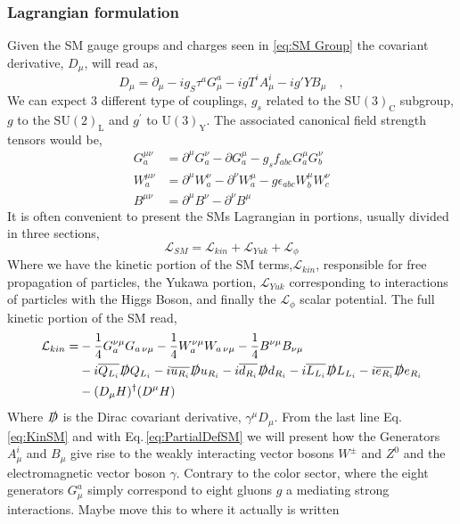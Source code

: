 \subsubsection{Lagrangian formulation }
Given the SM gauge groups and charges seen in \ref{eq:SM Group} the covariant derivative, $D_\mu$, will read as, 
%
\begin{equation}
\label{eq:PartialDefSM}
D_\mu = \partial_\mu - i g_S \tau^a G^a_\mu - i g T^i A^i_\mu - i g' Y B_\mu \quad ,  
\end{equation}  
%
We can expect 3 different type of couplings, $g_s$ related to the $\mathrm{SU(3)_C}$ subgroup, $g$ to the $\mathrm{SU(2)_L}$ and $g^\prime$ to $\mathrm{U(3)_Y}$. The associated canonical field strength tensors would be,
\begin{align}
G_a^{\mu \nu} & = \partial^\mu G^\nu_a - \partial G^\mu_a - g_s f_{abc} G_a^\mu G_b^\nu  \\ 
W_a^{\mu \nu} & = \partial^\mu W^\nu_a - \partial^\nu W^\mu_a  - g \epsilon_{abc} W^\mu_b W^\nu_c \\
B^{\mu \nu}   & = \partial^\mu B^\nu - \partial^\nu B^\mu 
\end{align}
It is often convenient to present the SMs Lagrangian in portions, usually divided in three sections,
\begin{equation}
\mathcal{L}_{SM} = \mathcal{L}_{kin}  +  \mathcal{L}_{Yuk} +  \mathcal{L}_{\phi} 	
\end{equation}
Where we have the kinetic portion of the SM terms,$\mathcal{L}_{kin}$, responsible for  free propagation of particles, the Yukawa portion, $\mathcal{L}_{Yuk}$  corresponding to interactions of particles with the Higgs Boson, and finally the $\mathcal{L}_{\phi}$ scalar potential. The full kinetic portion of the SM read, 
%
\begin{align}
\label{eq:KinSM}
\mathcal{L}_{kin} = & - \frac{1}{4} G^{\nu \mu}_a G_{a \,\nu \mu}  - \frac{1}{4}  W^{\nu \mu}_a W_{a \,\nu \mu}  
- \frac{1}{4}  B^{\nu \mu} B_{\nu \mu} \nonumber \\ 
 & -i \overline{Q_{L_i}} \slashed{D} Q_{L_i} 
   -i \overline{u_{R_i}} \slashed{D} u_{R_i}  
   -i \overline{d_{R_i}} \slashed{D} d_{R_i}  
   -i \overline{L_{L_i}} \slashed{D} L_{L_i}    
   -i \overline{e_{R_i}} \slashed{D} e_{R_i}   \\
 & - (D_\mu H)^\dagger ( D^\mu H )   \nonumber 
\end{align}
Where $\slashed{D}$ is the Dirac covariant derivative, $\gamma^\mu D_\mu$. { \color{gray} From the last line Eq.\,\ref{eq:KinSM} and with Eq.\,\ref{eq:PartialDefSM} we will present how the Generators $A^i_\mu$ and $B_\mu$ give rise to the weakly interacting vector bosons $W^\pm$ and $Z^0$ and the electromagnetic vector boson $\gamma$. Contrary to the color sector, where the eight generators $G^a_\mu$ simply correspond to eight gluons $g$ a mediating strong interactions. } { \color{blue} Maybe move this to where it actually is written } 

